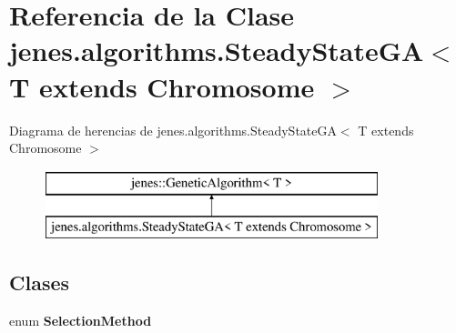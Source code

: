 \hypertarget{classjenes_1_1algorithms_1_1_steady_state_g_a_3_01_t_01extends_01_chromosome_01_4}{\section{Referencia de la Clase jenes.\-algorithms.\-Steady\-State\-G\-A$<$ T extends Chromosome $>$}
\label{classjenes_1_1algorithms_1_1_steady_state_g_a_3_01_t_01extends_01_chromosome_01_4}
}
Diagrama de herencias de jenes.\-algorithms.\-Steady\-State\-G\-A$<$ T extends Chromosome $>$\begin{figure}[H]
\begin{center}
\leavevmode
\includegraphics[height=2.000000cm]{classjenes_1_1algorithms_1_1_steady_state_g_a_3_01_t_01extends_01_chromosome_01_4}
\end{center}
\end{figure}
\subsection*{Clases}
\begin{DoxyCompactItemize}
\item 
enum {\bfseries Selection\-Method}
\end{DoxyCompactItemize}
